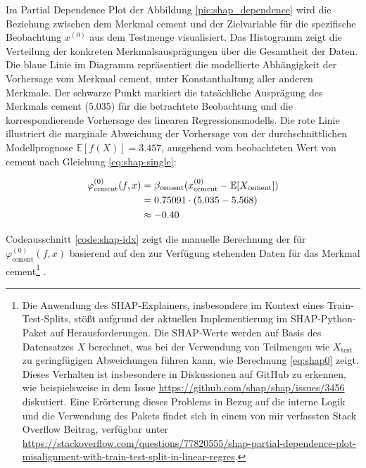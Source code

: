 Im Partial Dependence Plot der Abbildung \ref{pic:shap_dependence} wird die Beziehung zwischen 
dem Merkmal cement und der Zielvariable für die spezifische Beobachtung $x^{(0)}$ aus dem Testmenge visualisiert. 
Das Histogramm zeigt die Verteilung der konkreten Merkmalsausprägungen über die Gesamtheit der Daten.
Die blaue Linie im Diagramm repräsentiert die modellierte Abhängigkeit der Vorhersage vom Merkmal cement, 
unter Konstanthaltung aller anderen Merkmale. Der schwarze Punkt markiert die tatsächliche Ausprägung des 
Merkmals cement ($5.035$) für die betrachtete Beobachtung und die korrespondierende Vorhersage 
des linearen Regressionsmodells. Die rote Linie illustriert die marginale Abweichung der Vorhersage 
von der durchschnittlichen Modellprognose $\mathbb{E}[f(X)] = 3.457$, ausgehend vom 
beobachteten Wert von cement nach Gleichung \ref{eq:shap-single}:

\begin{align}
    \label{eq:shap0}
    \varphi_{\text{cement}}^{(0)}(f, x) &= \beta_{\text{cement}} (x_{\text{cement}}^{(0)} - \mathbb{E}[X_{\text{cement}}]) \\ \notag
                        &= 0.75091 \cdot (5.035 - 5.568) \\ \notag
                        &\approx -0.40
\end{align}

Codeausschnitt \ref{code:shap-idx} zeigt die manuelle Berechnung der für $\varphi_{\text{cement}}^{(0)}(f, x)$ basierend
auf den zur Verfügung stehenden Daten für das Merkmal cement\footnote{Die Anwendung des SHAP-Explainers, 
insbesondere im Kontext eines Train-Test-Splits, stößt aufgrund der aktuellen Implementierung im SHAP-Python-Paket 
auf Herausforderungen. Die SHAP-Werte werden auf Basis des Datensatzes $X$ berechnet, 
was bei der Verwendung von Teilmengen wie $X_{\text{test}}$ zu geringfügigen Abweichungen führen kann, wie Berechnung \ref{eq:shap0} zeigt.
Dieses Verhalten ist insbesondere in Diskussionen auf GitHub zu erkennen, wie beispielsweise in dem Issue 
\url{https://github.com/shap/shap/issues/3456} diskutiert. Eine Erörterung dieses Problems in Bezug auf die interne Logik und die Verwendung des Pakets
findet sich in einem von mir verfassten Stack Overflow Beitrag, verfügbar unter 
\url{https://stackoverflow.com/questions/77820555/shap-partial-dependence-plot-misalignment-with-train-test-split-in-linear-regres}.}
.



